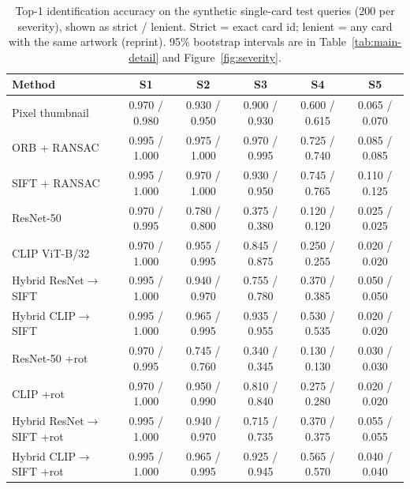 \begin{table}[htbp]\centering\footnotesize
\caption[Top-1 accuracy per method and severity]{Top-1 identification accuracy on the synthetic single-card test queries (200 per severity), shown as strict / lenient. Strict = exact card id; lenient = any card with the same artwork (reprint). 95\% bootstrap intervals are in Table~\ref{tab:main-detail} and Figure~\ref{fig:severity}.}
\label{tab:main}
\begin{tabular}{@{}lccccc@{}}
\toprule
Method & S1 & S2 & S3 & S4 & S5\\
\midrule
Pixel thumbnail & 0.970 / 0.980 & 0.930 / 0.950 & 0.900 / 0.930 & 0.600 / 0.615 & 0.065 / 0.070\\
\midrule
ORB + RANSAC & 0.995 / 1.000 & 0.975 / 1.000 & 0.970 / 0.995 & 0.725 / 0.740 & 0.085 / 0.085\\
SIFT + RANSAC & 0.995 / 1.000 & 0.970 / 1.000 & 0.930 / 0.950 & 0.745 / 0.765 & 0.110 / 0.125\\
ResNet-50 & 0.970 / 0.995 & 0.780 / 0.800 & 0.375 / 0.380 & 0.120 / 0.120 & 0.025 / 0.025\\
CLIP ViT-B/32 & 0.970 / 1.000 & 0.955 / 0.995 & 0.845 / 0.875 & 0.250 / 0.255 & 0.020 / 0.020\\
Hybrid ResNet$\to$SIFT & 0.995 / 1.000 & 0.940 / 0.970 & 0.755 / 0.780 & 0.370 / 0.385 & 0.050 / 0.050\\
Hybrid CLIP$\to$SIFT & 0.995 / 1.000 & 0.965 / 0.995 & 0.935 / 0.955 & 0.530 / 0.535 & 0.020 / 0.020\\
ResNet-50 +rot & 0.970 / 0.995 & 0.745 / 0.760 & 0.340 / 0.345 & 0.130 / 0.130 & 0.030 / 0.030\\
CLIP +rot & 0.970 / 1.000 & 0.950 / 0.990 & 0.810 / 0.840 & 0.275 / 0.280 & 0.020 / 0.020\\
Hybrid ResNet$\to$SIFT +rot & 0.995 / 1.000 & 0.940 / 0.970 & 0.715 / 0.735 & 0.370 / 0.375 & 0.055 / 0.055\\
Hybrid CLIP$\to$SIFT +rot & 0.995 / 1.000 & 0.965 / 0.995 & 0.925 / 0.945 & 0.565 / 0.570 & 0.040 / 0.040\\
\bottomrule
\end{tabular}
\end{table}
